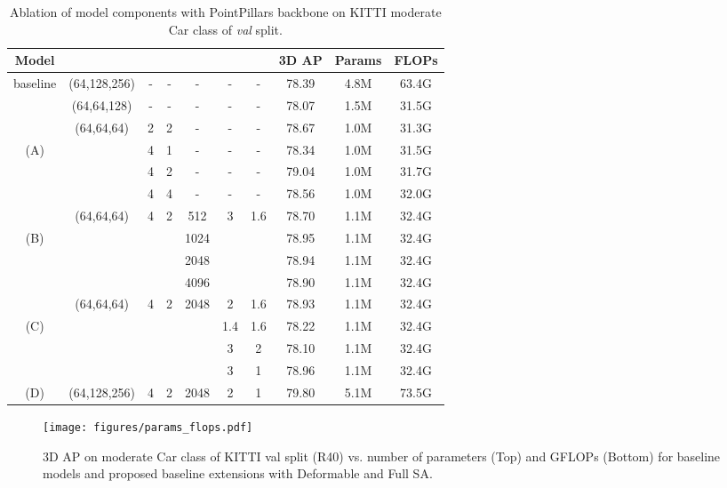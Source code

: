 \documentclass[10pt,twocolumn,letterpaper]{article}
\begin{document}
\setlength{\tabcolsep}{1.0pt}
\begin{table}[t]
\footnotesize
    \centering
    \begin{tabular*}{\linewidth}{c||cccccc|ccc}
        \hline
        Model &  &  &   &  &  &  & 3D AP & Params & FLOPs\\
        \hline
        baseline & (64,128,256) & - & - &  - & - & - & 78.39 & 4.8M & 63.4G \\
         & (64,64,128) & - & - &  - & - & - & 78.07 & 1.5M  & 31.5G \\
        \hline 
        & (64,64,64) & 2 & 2 &  - & - & - & 78.67 & 1.0M & 31.3G \\
        (A) &  & 4 & 1 &  - & - & - & 78.34 & 1.0M & 31.5G \\
        &  & 4 & 2 &  - & - & - & 79.04 & 1.0M & 31.7G \\
        &  & 4 & 4 &  - & - & - & 78.56 & 1.0M & 32.0G \\
        \hline
        & (64,64,64) & 4 & 2 &  512 & 3 & 1.6 & 78.70 & 1.1M & 32.4G \\
        (B) & & &  &  1024 &  &  & 78.95 & 1.1M & 32.4G \\
         &  &  &  &   2048 &  &  & 78.94 & 1.1M & 32.4G \\
        &  & &  &   4096 &  &  & 78.90 & 1.1M & 32.4G \\
        \hline
        &  (64,64,64) & 4 & 2 & 2048 & 2 & 1.6 & 78.93 & 1.1M & 32.4G \\
        (C) & & &  &    & 1.4 & 1.6 & 78.22 & 1.1M & 32.4G \\
        &  &  &  &  & 3 & 2 & 78.10 & 1.1M & 32.4G \\
        &  &  &  &  & 3 & 1 & 78.96 & 1.1M & 32.4G \\
        \hline
        (D) & (64,128,256) & 4 & 2 &  2048 & 2 & 1 & 79.80 & 5.1M & 73.5G \\
        \hline
    \end{tabular*}
    \caption{Ablation of model components with PointPillars backbone on KITTI moderate Car class of \textit{val} split.}
    \label{tab:ablation_components}
\end{table} 
\begin{figure}[t]
    \centering
    \texttt{[image: figures/params\_flops.pdf]}
    \caption{3D AP on moderate Car class of KITTI val split (R40) vs. number of parameters (Top) and GFLOPs (Bottom) for baseline models and proposed baseline extensions with Deformable and Full SA.}
    \label{teaser_graph}
    \vspace{-0.5cm}
\end{figure}
\end{document}
